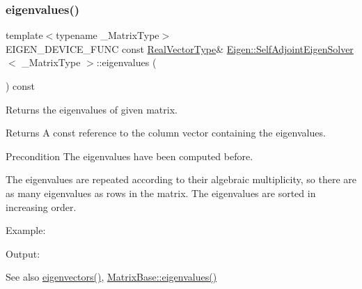 \subsubsection{\texorpdfstring{eigenvalues()}{eigenvalues()}}
{\footnotesize\ttfamily template$<$typename \+\_\+\+Matrix\+Type$>$ \\
E\+I\+G\+E\+N\+\_\+\+D\+E\+V\+I\+C\+E\+\_\+\+F\+U\+NC const \mbox{\hyperlink{class_eigen_1_1_self_adjoint_eigen_solver_acd090d5fdfc3cc017a13b6d8daa92287}{Real\+Vector\+Type}}\& \mbox{\hyperlink{class_eigen_1_1_self_adjoint_eigen_solver}{Eigen\+::\+Self\+Adjoint\+Eigen\+Solver}}$<$ \+\_\+\+Matrix\+Type $>$\+::eigenvalues (\begin{DoxyParamCaption}{ }\end{DoxyParamCaption}) const\hspace{0.3cm}{\ttfamily [inline]}}



Returns the eigenvalues of given matrix. 

\begin{DoxyReturn}{Returns}
A const reference to the column vector containing the eigenvalues.
\end{DoxyReturn}
\begin{DoxyPrecond}{Precondition}
The eigenvalues have been computed before.
\end{DoxyPrecond}
The eigenvalues are repeated according to their algebraic multiplicity, so there are as many eigenvalues as rows in the matrix. The eigenvalues are sorted in increasing order.

Example\+: 
\begin{DoxyCodeInclude}{0}
\end{DoxyCodeInclude}
 Output\+: 
\begin{DoxyVerbInclude}
\end{DoxyVerbInclude}


\begin{DoxySeeAlso}{See also}
\mbox{\hyperlink{class_eigen_1_1_self_adjoint_eigen_solver_a7b9f7e641fa46ac4c5f2371405c69b2b}{eigenvectors()}}, \mbox{\hyperlink{class_eigen_1_1_matrix_base_a30430fa3d5b4e74d312fd4f502ac984d}{Matrix\+Base\+::eigenvalues()}} 
\end{DoxySeeAlso}
\mbox{\label{class_eigen_1_1_self_adjoint_eigen_solver_a7b9f7e641fa46ac4c5f2371405c69b2b}} 
